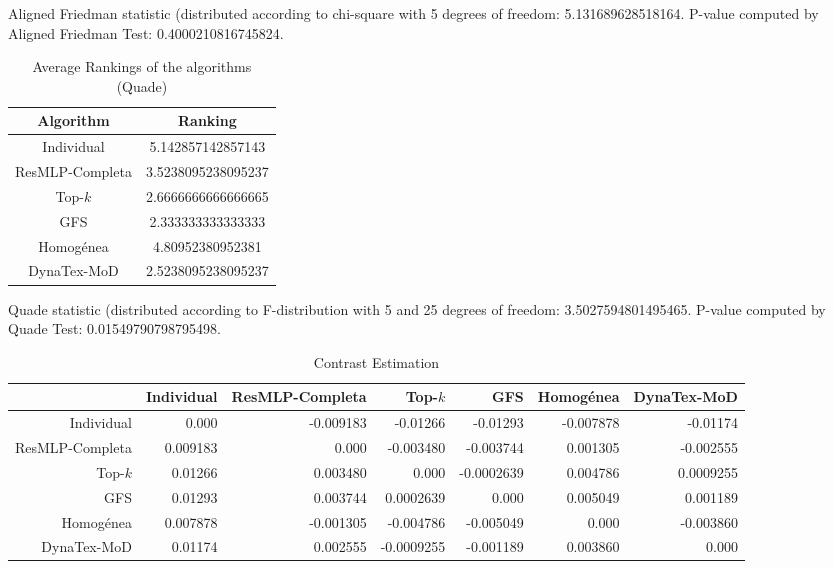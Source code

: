 \documentclass[a4paper,10pt]{article}
\begin{document}
\begin{landscape}
Aligned Friedman statistic (distributed according to chi-square with 5 degrees of freedom: 5.131689628518164. 
P-value computed by Aligned Friedman Test: 0.4000210816745824.\newline


\newpage

\begin{table}[!htp]
\centering
\caption{Average Rankings of the algorithms (Quade)
}\begin{tabular}{c|c}
Algorithm&Ranking\\
\hline
Individual&5.142857142857143\\
ResMLP-Completa&3.5238095238095237\\
Top-$k$&2.6666666666666665\\
GFS&2.333333333333333\\
Homogénea&4.80952380952381\\
DynaTex-MoD&2.5238095238095237\\
\end{tabular}
\end{table}
Quade statistic (distributed according to F-distribution with 5 and 25 degrees of freedom: 3.5027594801495465. 
P-value computed by Quade Test: 0.01549790798795498.\newline


\newpage

\begin{table}[!htp]
\centering\tiny
\caption{Contrast Estimation}
\begin{tabular}{
|r|r|r|r|r|r|r|}
\hline
 &Individual&ResMLP-Completa&Top-$k$&GFS&Homogénea&DynaTex-MoD\\
\hline
Individual&0.000&-0.009183&-0.01266&-0.01293&-0.007878&-0.01174\\
\hline
ResMLP-Completa&0.009183&0.000&-0.003480&-0.003744&0.001305&-0.002555\\
\hline
Top-$k$&0.01266&0.003480&0.000&-0.0002639&0.004786&0.0009255\\
\hline
GFS&0.01293&0.003744&0.0002639&0.000&0.005049&0.001189\\
\hline
Homogénea&0.007878&-0.001305&-0.004786&-0.005049&0.000&-0.003860\\
\hline
DynaTex-MoD&0.01174&0.002555&-0.0009255&-0.001189&0.003860&0.000\\
\hline

\end{tabular}
\end{table}

\newpage


\end{landscape}
\end{document}
